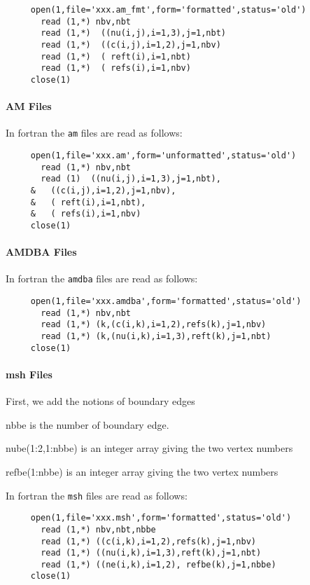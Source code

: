 \documentclass[twoside]{book}
\newenvironment{ttlist}
   {\begin{list}{}{\renewcommand{\makelabel}[1]{\texttt{##1}\hfil}%
        \setlength{\labelwidth}{3cm}
        \setlength{\leftmargin}{\labelwidth+\labelsep}
    }}%
   {\end{list}}
\begin{document}
\begin{verbatim}
     open(1,file='xxx.am_fmt',form='formatted',status='old')
       read (1,*) nbv,nbt
       read (1,*)  ((nu(i,j),i=1,3),j=1,nbt)
       read (1,*)  ((c(i,j),i=1,2),j=1,nbv)
       read (1,*)  ( reft(i),i=1,nbt)
       read (1,*)  ( refs(i),i=1,nbv)
     close(1)
\end{verbatim}

\paragraph{AM Files}\label{AM}
In fortran the  {\tt am}  files are read as follows:

\begin{verbatim}
     open(1,file='xxx.am',form='unformatted',status='old')
       read (1,*) nbv,nbt
       read (1)  ((nu(i,j),i=1,3),j=1,nbt),
     &   ((c(i,j),i=1,2),j=1,nbv),
     &   ( reft(i),i=1,nbt),
     &   ( refs(i),i=1,nbv)
     close(1)
\end{verbatim}
\paragraph{AMDBA Files}\label{AMDBA}
In fortran the  {\tt amdba}  files are read as follows:
\begin{verbatim}
     open(1,file='xxx.amdba',form='formatted',status='old')
       read (1,*) nbv,nbt
       read (1,*) (k,(c(i,k),i=1,2),refs(k),j=1,nbv)
       read (1,*) (k,(nu(i,k),i=1,3),reft(k),j=1,nbt)
     close(1)
\end{verbatim}
\paragraph{msh Files}\label{MSH}
First, we add the notions of boundary edges
  \begin{ttlist}
  \item [nbbe] is the number of boundary edge.
  \item [nube(1:2,1:nbbe)] is an integer array giving the two vertex numbers
  \item [refbe(1:nbbe)] is an integer array giving the two vertex numbers
  \end{ttlist} 
In fortran the  {\tt msh}  files are read as follows:
\begin{verbatim}
     open(1,file='xxx.msh',form='formatted',status='old')
       read (1,*) nbv,nbt,nbbe
       read (1,*) ((c(i,k),i=1,2),refs(k),j=1,nbv)
       read (1,*) ((nu(i,k),i=1,3),reft(k),j=1,nbt)
       read (1,*) ((ne(i,k),i=1,2), refbe(k),j=1,nbbe)
     close(1)
\end{verbatim}
\end{document}
